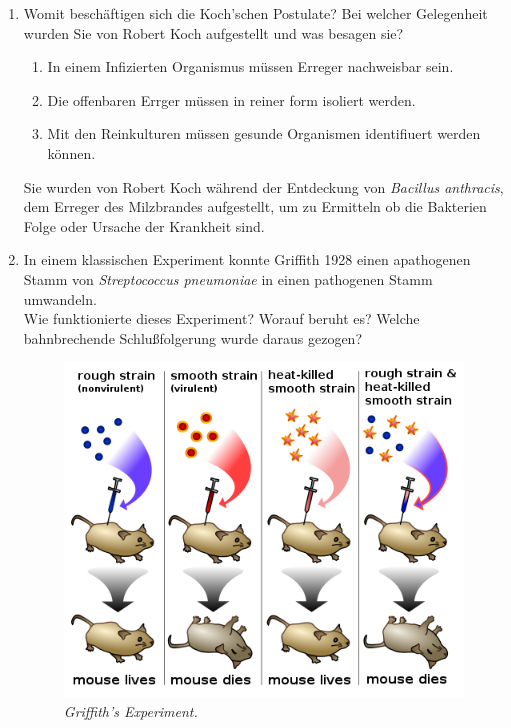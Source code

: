 \begin{enumerate}
	\item Womit beschäftigen sich die Koch’schen Postulate?
	Bei welcher Gelegenheit wurden Sie von Robert Koch aufgestellt und was besagen sie? \hfill \vspace{4mm}

	\begin{enumerate}[label=\arabic*)]
		\item In einem Infizierten Organismus müssen Erreger nachweisbar sein.
		\item Die offenbaren Errger müssen in reiner form isoliert werden.
		\item Mit den Reinkulturen müssen gesunde Organismen identifiuert werden können.
	\end{enumerate}
	Sie wurden von Robert Koch während der Entdeckung von \emph{Bacillus anthracis},
	dem Erreger des Milzbrandes aufgestellt,
	um zu Ermitteln ob die Bakterien Folge oder Ursache der Krankheit sind.	
	

	\item In einem klassischen Experiment konnte Griffith 1928 einen apathogenen Stamm von
	\emph{Streptococcus pneumoniae} in einen pathogenen Stamm umwandeln.\\
	Wie funktionierte dieses Experiment? Worauf beruht es? 
	Welche bahnbrechende Schlußfolgerung wurde daraus gezogen? \hfill \vspace{4mm}
	
	\begin{figure}[ht!]
	\leavevmode
	\begin{center}
	\includegraphics[scale=0.47]{./pictures/griffith_exp_500}
	\end{center}
	\caption{\slshape{Griffith's Experiment.}}
	\label{fig:griffith}
	\end{figure}


\end{enumerate}
